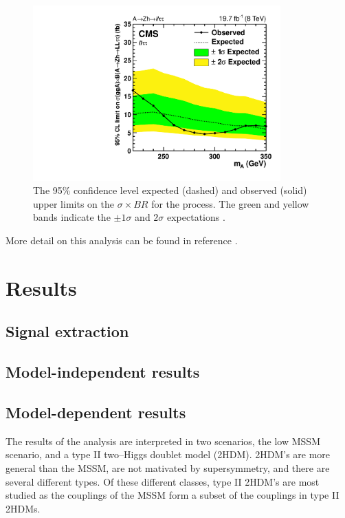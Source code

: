 \begin{figure}[h!]
\begin{center}
\includegraphics[width=0.85\textwidth]{Hhh/Plots/CMS-HIG-14-034_Figure_010-a.pdf}
\caption{The 95\% confidence level expected (dashed) and observed (solid)
upper limits on the $\sigma \times BR$ for the \AtoZhtolltautau process.
The green and yellow bands indicate the $\pm 1 \sigma $ and $2\sigma$
expectations \cite{CMS-HIG-14-034}.}
\label{fig:AZhUpperLimits}
\end{center}
\end{figure}



More detail on this analysis can be found in reference \cite{CMS-HIG-14-034}.




\section{Results}
\label{sec:hhh_results}

\subsection{Signal extraction}
\label{sec:hhh_results_extraction}

\subsection{Model-independent results}
\label{sec:hhh_results_modelindep}


\subsection{Model-dependent results}
\label{sec:hhh_results_modeldep}
The results of the analysis are interpreted in two scenarios, the low \tanb MSSM
scenario, and a type II two--Higgs doublet model (2HDM). 2HDM's are more general
than the MSSM, are not mativated by supersymmetry, and there are several different types. 
Of these different classes, type II 2HDM's are most studied
as the couplings of the MSSM form a subset of the couplings in type II 2HDMs. 

